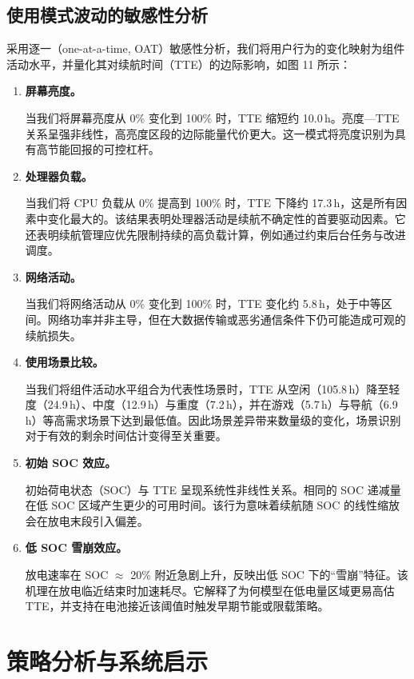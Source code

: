 \documentclass[11pt,a4paper]{ctexart}
\begin{document}
\subsection{使用模式波动的敏感性分析}

采用逐一（one-at-a-time, OAT）敏感性分析，我们将用户行为的变化映射为组件活动水平，并量化其对续航时间（TTE）的边际影响，如图 11 所示：

\begin{enumerate}[leftmargin=2.6em,label=（\alph*）]
\item \textbf{屏幕亮度。}

当我们将屏幕亮度从 0\% 变化到 100\% 时，TTE 缩短约 10.0\,h。亮度—TTE 关系呈强非线性，高亮度区段的边际能量代价更大。这一模式将亮度识别为具有高节能回报的可控杠杆。

\item \textbf{处理器负载。}

当我们将 CPU 负载从 0\% 提高到 100\% 时，TTE 下降约 17.3\,h，这是所有因素中变化最大的。该结果表明处理器活动是续航不确定性的首要驱动因素。它还表明续航管理应优先限制持续的高负载计算，例如通过约束后台任务与改进调度。

\item \textbf{网络活动。}

当我们将网络活动从 0\% 变化到 100\% 时，TTE 变化约 5.8\,h，处于中等区间。网络功率并非主导，但在大数据传输或恶劣通信条件下仍可能造成可观的续航损失。

\item \textbf{使用场景比较。}

当我们将组件活动水平组合为代表性场景时，TTE 从空闲（105.8\,h）降至轻度（24.9\,h）、中度（12.9\,h）与重度（7.2\,h），并在游戏（5.7\,h）与导航（6.9\,h）等高需求场景下达到最低值。因此场景差异带来数量级的变化，场景识别对于有效的剩余时间估计变得至关重要。

\item \textbf{初始 SOC 效应。}

初始荷电状态（SOC）与 TTE 呈现系统性非线性关系。相同的 SOC 递减量在低 SOC 区域产生更少的可用时间。该行为意味着续航随 SOC 的线性缩放会在放电末段引入偏差。

\item \textbf{低 SOC 雪崩效应。}

放电速率在 SOC $\approx$ 20\% 附近急剧上升，反映出低 SOC 下的“雪崩”特征。该机理在放电临近结束时加速耗尽。它解释了为何模型在低电量区域更易高估 TTE，并支持在电池接近该阈值时触发早期节能或限载策略。
\end{enumerate}

\section{策略分析与系统启示}
\end{document}
